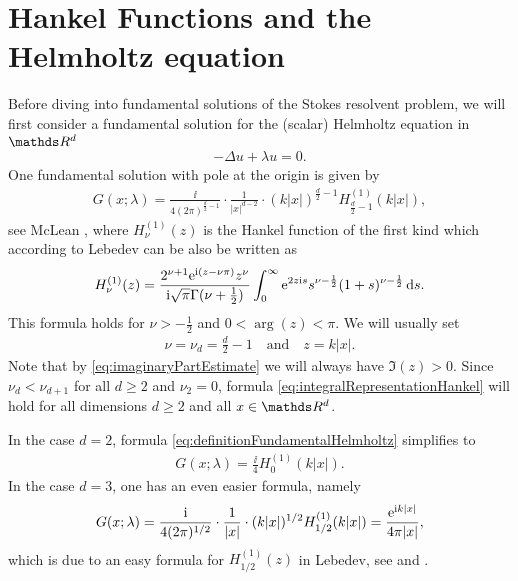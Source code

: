 \section{Hankel Functions and the Helmholtz equation}

Before diving into fundamental solutions of the Stokes resolvent problem, we will first consider a fundamental solution for the (scalar) Helmholtz equation in $\R^d$
\begin{align*}
-\Delta u + \lambda u = 0.
\end{align*}
One fundamental solution with pole at the origin is given by
\begin{align}
  \label{eq:definitionFundamentalHelmholtz}
  G(x; \lambda) = \frac{\ii}{4 ( 2\pi )^{\frac{d}{2} - 1}} \cdot \frac{1}{|x|^{d - 2}} \cdot (k |x|)^{\frac{d}{2} - 1} H_{\frac{d}{2} - 1}^{(1)} (k|x|),
\end{align}
see McLean \cite[Eq. (9.14)]{mclean}, where $H_{\nu}^{(1)}(z)$ is the Hankel function of the first kind which according to Lebedev \cite[Sec. 5.11]{lebedev} can be also be written as
\begin{align}
  \label{eq:integralRepresentationHankel}
  H_\nu^{(1)}(z) = \frac{2^{\nu + 1} \mathrm{e}^{\mathrm{i}(z - \nu \pi)} z^\nu}{\mathrm{i} \sqrt{\pi} \Gamma(\nu + \frac{1}{2})} \int_0^\infty \mathrm{e}^{2 z \mathrm{i} s} s^{\nu - \frac{1}{2}} (1 + s)^{\nu - \frac{1}{2}} \, {\operatorname{d}\!{s}}.
\end{align}
This formula holds for $\nu > -\frac{1}{2}$ and $0 < \arg(z) < \pi$.
We will usually set 
\begin{align*}
  \nu = \nu_d = \frac{d}{2} - 1 \quad\text{and}\quad z = k|x|. 
\end{align*}
Note that by \eqref{eq:imaginaryPartEstimate} we will always have $\Im(z) > 0$. 
Since $\nu_d < \nu_{d + 1}$ for all $d \geq 2$ and $\nu_2 = 0$, formula \eqref{eq:integralRepresentationHankel} will hold for all dimensions $d \geq 2$ and all $x \in \R^d$.

In the case $d = 2$, formula \eqref{eq:definitionFundamentalHelmholtz} simplifies to 
\begin{align}
  \label{eq:2dDefinitionFundamentalHelmholtz}
  G(x;\lambda) = \frac{\ii}{4} H_{0}^{(1)}(k|x|).
\end{align}
In the case $d = 3$, one has an even easier formula, namely
\begin{align}
  \label{eq:3dDefinitionFundamentalHelmholtz}
  G(x; \lambda) = \frac{\mathrm{i}}{4(2\pi)^{1/2}} \cdot \frac{1}{|x|} \cdot (k |x|)^{1/2} H_{1/2}^{(1)}(k|x|) =  \frac{\mathrm{e}^{\mathrm{i} k |x|}}{4 \pi |x|},
\end{align}
which is due to an easy formula for $H_{1/2}^{(1)}(z)$ in Lebedev, see \cite[Eq. (5.8.4)]{lebedev} and \cite[Eq. (9.15)]{mclean}.

